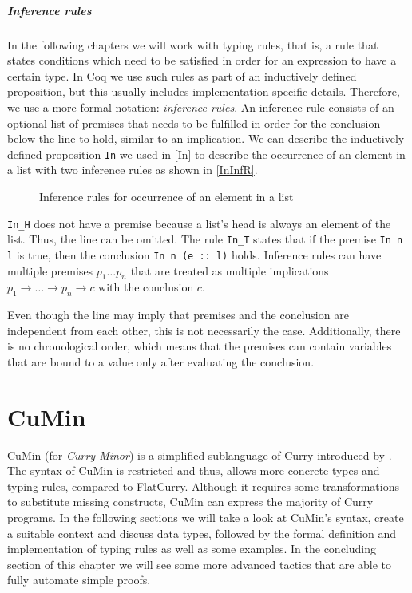 \documentclass[paper = a4, fleqn, abstract=on, twoside]{scrreprt}
\newcommand{\coqinline}[1]{\texttt{#1}}
\begin{document}
\paragraph{Inference rules}
In the following chapters we will work with typing rules, that is, a rule that states conditions which need to be satisfied in order for an expression to have a certain type. In Coq we use such rules as part of an inductively defined proposition, but this usually includes implementation-specific details. Therefore, we use a more formal notation: \textit{inference rules}.\label{infrules} An inference rule consists of an optional list of premises that needs to be fulfilled in order for the conclusion below the line to hold, similar to an implication.
We can describe the inductively defined proposition \coqinline{In} we used in \autoref{In} to describe the occurrence of an element in a list with two inference rules as shown in \autoref{InInfR}.
\begin{figure}[H]
	\begin{center}
		\begin{minipage}{.45 \linewidth}
			\infer[\text{\texttt{In\_H}}]{\coqinline{In n (n :: l)}}{\phantom{premise}}
		\end{minipage}
		\hspace{.1 \linewidth}
		\begin{minipage}{.45 \linewidth}
			\infer[\text{\texttt{In\_T}}]{\coqinline{In n (e :: l)}}{\coqinline{In n l}}
		\end{minipage}
	\end{center}
	\caption{Inference rules for occurrence of an element in a list}
	\label{InInfR}
\end{figure} \noindent
\texttt{In\_H} does not have a premise because a list's head is always an element of the list. Thus, the line can be omitted. The rule \texttt{In\_T} states that if the premise \texttt{In n l} is true, then the conclusion \texttt{In n (e :: l)} holds. Inference rules can have multiple premises $p_1 \dots p_n$ that are treated as multiple implications $p_1 \rightarrow \dots \rightarrow p_n \rightarrow c$ with the conclusion $c$.
\par
Even though the line may imply that premises and the conclusion are independent from each other, this is not necessarily the case. Additionally, there is no chronological order, which means that the premises can contain variables that are bound to a value only after evaluating the conclusion.
\chapter{CuMin}
\label{cumin}
CuMin (for \textit{Curry Minor}) is a simplified sublanguage of Curry introduced by \citet{p19mehner}. The syntax of CuMin is restricted and thus, allows more concrete types and typing rules, compared to FlatCurry. Although it requires some transformations to substitute missing constructs, CuMin can express the majority of Curry programs. In the following sections we will take a look at CuMin's syntax, create a suitable context and discuss data types, followed by the formal definition and implementation of typing rules as well as some examples. In the concluding section of this chapter we will see some more advanced tactics that are able to fully automate simple proofs.
\end{document}
